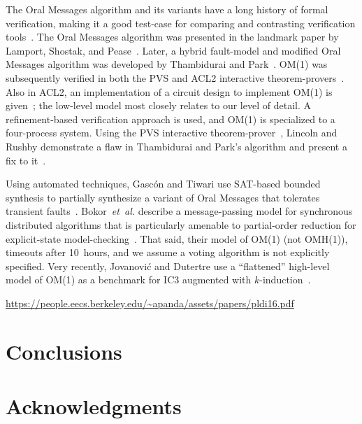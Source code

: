 \documentclass{llncs/llncs}
\newcommand{\lee}[1]{ } %
\newcommand{\lee}[1]{ {\color{blue}$<$lee: #1$>$} } %
\begin{document}
The Oral Messages algorithm and its variants have a long history of formal verification, making it a good test-case for comparing and contrasting verification tools~\cite{pvs}. The Oral Messages algorithm was presented in the landmark paper by Lamport, Shostak, and Pease~\cite{om}. Later, a hybrid fault-model and modified Oral Messages algorithm was developed by Thambidurai and Park~\cite{hybrid}. OM(1) was subsequently verified in both the PVS and ACL2 interactive theorem-provers~\cite{Young97:IC}. Also in ACL2, an implementation of a circuit design to implement OM(1) is given~\cite{om-acl2-impl}; the low-level model most closely relates to our level of detail. A refinement-based verification approach is used, and OM(1) is specialized to a four-process system. Using the PVS interactive theorem-prover~\cite{pvs}, Lincoln and Rushby demonstrate a flaw in Thambidurai and Park's algorithm and present a fix to it~\cite{csl-93-2}.

Using automated techniques, Gasc{\'{o}}n and Tiwari use SAT-based bounded synthesis to partially synthesize a variant of Oral Messages that tolerates transient faults~\cite{om1-synth}. Bokor~\emph{et~al.} describe a message-passing model for synchronous distributed algorithms that is particularly amenable to partial-order reduction for explicit-state model-checking~\cite{Bokor2010}. That said, their model of OM(1) (not OMH(1)), timeouts after 10~hours, and we assume a voting algorithm is not explicitly specified. Very recently, Jovanovi{\'{c}} and Dutertre use a ``flattened'' high-level model of OM(1) as a benchmark for IC3 augmented with $k$-induction~\cite{pdr-kind}.

\url{https://people.eecs.berkeley.edu/~apanda/assets/papers/pldi16.pdf}

\section{Conclusions}\label{sec:conclusions}

\lee{talk about compositional verification of properties, even though SAL doesn't directly support it}
\lee{talk about k-induction vs. PDR}
\lee{talk about lack of axiomatization in model-checking (multiple rushby bugs), but  tradeoff of deadlock. see proglema paper}

\lee{talk about atom-sally}

\section*{Acknowledgments}
\lee{NASA contract, honeywell ppl, rushby's model?}



\end{document}
